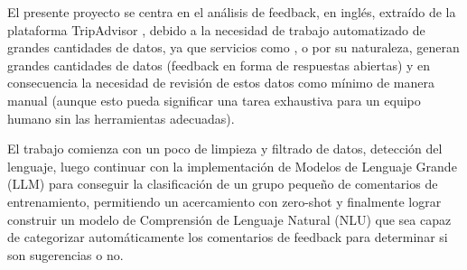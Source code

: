 El presente proyecto se centra en el análisis de feedback, en inglés, extraído de la plataforma TripAdvisor \cite{tripadvisor-website}, debido a la necesidad de trabajo automatizado de grandes cantidades de datos, ya que servicios como \textcite{tripadvisor-website}, \textcite{booking_oficial_2026} o \textcite{airbnb_oficial_2026} por su naturaleza, generan grandes cantidades de datos (feedback en forma de respuestas abiertas) y en consecuencia la necesidad de revisión de estos datos como mínimo de manera manual (aunque esto pueda significar una tarea exhaustiva para un equipo humano sin las herramientas adecuadas).

El trabajo comienza con un poco de limpieza y filtrado de datos, detección del lenguaje, luego continuar con la implementación de Modelos de Lenguaje Grande (LLM) para conseguir la clasificación de un grupo pequeño de comentarios de entrenamiento, permitiendo un acercamiento con zero-shot y finalmente lograr construir un modelo de Comprensión de Lenguaje Natural (NLU) que sea capaz de categorizar automáticamente los comentarios de feedback para determinar si son sugerencias o no.


